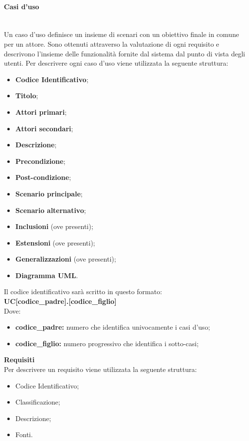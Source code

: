 \paragraph*{Casi d'uso\glo}\mbox{}\\ [1mm]
Un caso d'uso definisce un insieme di scenari con un obiettivo finale in comune per un attore. Sono ottenuti attraverso la valutazione di ogni requisito e descrivono l'insieme delle funzionalità fornite dal sistema dal punto di vista degli utenti.
Per descrivere ogni caso d'uso viene utilizzata la seguente struttura:
\begin{itemize}
	\item \textbf{Codice Identificativo};
	\item \textbf{Titolo};
	\item \textbf{Attori primari};
	\item \textbf{Attori secondari};
	\item \textbf{Descrizione};
	\item \textbf{Precondizione};
	\item \textbf{Post-condizione};
	\item \textbf{Scenario principale};
	\item \textbf{Scenario alternativo};
	\item \textbf{Inclusioni} (ove presenti);
	\item \textbf{Estensioni} (ove presenti);
	\item \textbf{Generalizzazioni} (ove presenti);
	\item \textbf{Diagramma UML}.	
\end{itemize}
Il codice identificativo sarà scritto in questo formato: \\
\textbf{UC[codice\_padre].[codice\_figlio]} \\
Dove:
\begin{itemize}
	\item \textbf{codice\_padre:} numero che identifica univocamente i casi d'uso\glo;
	\item \textbf{codice\_figlio:} numero progressivo che identifica i sotto-casi;
\end{itemize}
\textbf{Requisiti}\\%
Per descrivere un requisito viene utilizzata la seguente struttura:
\begin{itemize}
	\item Codice Identificativo;
	\item Classificazione;
	\item Descrizione;
	\item Fonti.
\end{itemize} 
